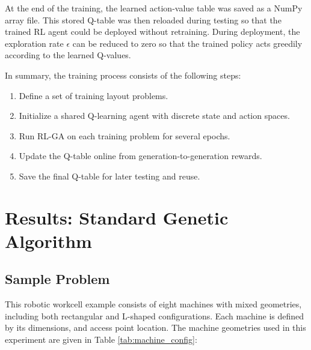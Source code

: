 \documentclass{article}
\begin{document}
At the end of the training, the learned action-value table was saved as a NumPy array file. This stored Q-table was then reloaded during testing so that the trained RL agent could be deployed without retraining. During deployment, the exploration rate $\epsilon$ can be reduced to zero so that the trained policy acts greedily according to the learned Q-values.

In summary, the training process consists of the following steps:
\begin{enumerate}
    \item Define a set of training layout problems.
    \item Initialize a shared Q-learning agent with discrete state and action spaces.
    \item Run RL-GA on each training problem for several epochs.
    \item Update the Q-table online from generation-to-generation rewards.
    \item Save the final Q-table for later testing and reuse.
\end{enumerate}

\newpage
\section{Results: Standard Genetic Algorithm}
\subsection{Sample Problem}
This robotic workcell example consists of eight machines with mixed geometries, including both rectangular and L-shaped configurations. Each machine is defined by its dimensions, and access point location. The machine geometries used in this experiment are given in Table \ref{tab:machine_config}:
\end{document}
